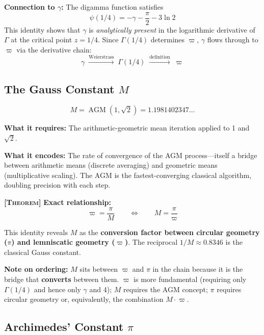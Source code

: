 \documentclass[11pt, letterpaper]{article}
\DeclareMathOperator{\AGM}{AGM}
\theoremstyle{definition}
\theoremstyle{remark}
\newcommand{\epi}[1]{\textbf{\textsc{[#1]}}}
\begin{document}
\noindent\textbf{Connection to $\gamma$:} The digamma function satisfies
\begin{equation}
    \psi(1/4) = -\gamma - \frac{\pi}{2} - 3\ln 2
\end{equation}
This identity shows that $\gamma$ is \textit{analytically present} in the logarithmic derivative of $\Gamma$ at the critical point $z = 1/4$. Since $\Gamma(1/4)$ determines $\varpi$, $\gamma$ flows through to $\varpi$ via the derivative chain:
\begin{equation}
    \gamma \;\xrightarrow{\text{Weierstrass}}\; \Gamma(1/4) \;\xrightarrow{\text{definition}}\; \varpi
\end{equation}

\subsection{The Gauss Constant $M$}

\begin{equation}
    M = \AGM(1, \sqrt{2}) = 1.1981402347\dots
\end{equation}

\noindent\textbf{What it requires:} The arithmetic-geometric mean iteration applied to 1 and $\sqrt{2}$.

\noindent\textbf{What it encodes:} The rate of convergence of the AGM process---itself a bridge between arithmetic means (discrete averaging) and geometric means (multiplicative scaling). The AGM is the fastest-converging classical algorithm, doubling precision with each step.

\epi{Theorem} \textbf{Exact relationship:}
\begin{equation}
    \varpi = \frac{\pi}{M} \qquad \Longleftrightarrow \qquad M = \frac{\pi}{\varpi}
\end{equation}

This identity reveals $M$ as the \textbf{conversion factor between circular geometry ($\pi$) and lemniscatic geometry ($\varpi$)}. The reciprocal $1/M \approx 0.8346$ is the classical Gauss constant.

\noindent\textbf{Note on ordering:} $M$ sits between $\varpi$ and $\pi$ in the chain because it is the bridge that \textbf{converts} between them. $\varpi$ is more fundamental (requiring only $\Gamma(1/4)$ and hence only $\gamma$ and 4); $M$ requires the AGM concept; $\pi$ requires circular geometry or, equivalently, the combination $M \cdot \varpi$.

\subsection{Archimedes' Constant $\pi$}
\end{document}
